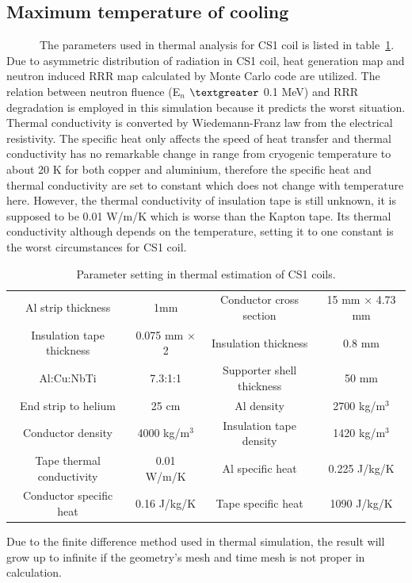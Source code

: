   \subsection{Maximum temperature of cooling}
~~~~~~The parameters used in thermal analysis for CS1 coil is listed in table~\ref{para}.
Due to asymmetric distribution of radiation in CS1 coil, heat generation map and neutron induced RRR map calculated by Monte Carlo code are utilized.
The relation between neutron fluence (E$_n$ $\textgreater$ 0.1 MeV) and RRR degradation is employed in this simulation because it predicts the worst situation.
Thermal conductivity is converted by Wiedemann-Franz law from the electrical resistivity.
The specific heat only affects the speed of heat transfer and thermal conductivity has no remarkable change in range from cryogenic temperature to about 20 K for both copper and aluminium, therefore the specific heat and thermal conductivity are set to constant which does not change with temperature here.
However, the thermal conductivity of insulation tape is still unknown, it is supposed to be 0.01 W/m/K which is worse than the Kapton tape.
Its thermal conductivity although depends on the temperature, setting it to one constant is the worst circumstances for CS1 coil.
 \begin{table}[H]
  \centering
  \begin{tabular}{cccc} \hline \hline
   Al strip thickness & 1mm & Conductor cross section & 15 mm $\times$ 4.73 mm \\
   Insulation tape thickness & 0.075 mm $\times$ 2 & Insulation thickness & 0.8 mm \\
   Al:Cu:NbTi & 7.3:1:1 & Supporter shell thickness & 50 mm \\
   End strip to helium & 25 cm & Al density & 2700 kg/m$^3$ \\
   Conductor density & 4000 kg/m$^3$ & Insulation tape density & 1420 kg/m$^3$ \\
   Tape thermal conductivity & 0.01 W/m/K & Al specific heat & 0.225 J/kg/K \\
   Conductor specific heat & 0.16 J/kg/K & Tape specific heat & 1090 J/kg/K \\ \hline \hline
  \end{tabular}
 \caption{Parameter setting in thermal estimation of CS1 coils.}
 \label{para}
 \end{table}
Due to the finite difference method used in thermal simulation, the result will grow up to infinite if the geometry's mesh and time mesh is not proper in calculation.
